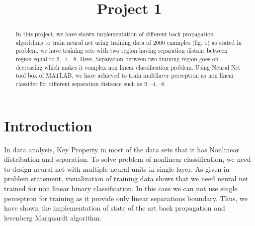 \documentclass[conference]{IEEEtran}
\begin{document}
\title{Project 1}

\author{
	\and
{}
\and	
{}
	
	
}


\maketitle


\begin{abstract}
 In this project, we have shown implementation of  different back propagation algorithms to train neural net using training data of 2000 examples (fig. 1) as stated in problem. we have training sets with two region having separation distant between region equal to 2, -4, -8. Here, Separation between two training region goes on decreasing which makes it complex non linear classification problem. Using Neural Net tool box of MATLAB, we have achieved to train multilayer perceptron as non linear classifier for different separation distance such as 2, -4, -8.


\end{abstract}

\section{Introduction}

In data analysis, Key Property in most of the data sets that it has Nonlinear distribution and separation. To solve problem of nonlinear classification, we need to design neural net with multiple neural units in single layer. As given in problem statement, visualization of training data shows that we need neural net trained for  non linear binary classification. In this case we can not use single perceptron for training as it provide only linear separations boundary. Thus, we have shown the implementation of state of the art back propagation and levenberg Marquardt algorithm.
\end{document}

